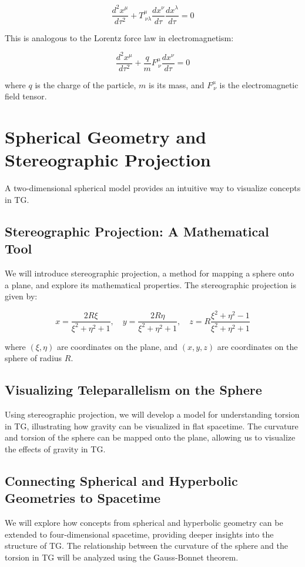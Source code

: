 \documentclass[12pt]{article}
\begin{document}
\[
\frac{d^2 x^\mu}{d\tau^2} + T^\mu_{\ \nu\lambda} \frac{dx^\nu}{d\tau} \frac{dx^\lambda}{d\tau} = 0
\]

This is analogous to the Lorentz force law in electromagnetism:

\[
\frac{d^2 x^\mu}{d\tau^2} + \frac{q}{m} F^\mu_{\ \nu} \frac{dx^\nu}{d\tau} = 0
\]

where \( q \) is the charge of the particle, \( m \) is its mass, and \( F^\mu_{\ \nu} \) is the electromagnetic field tensor.

\section{Spherical Geometry and Stereographic Projection}
A two-dimensional spherical model provides an intuitive way to visualize concepts in TG.

\subsection{Stereographic Projection: A Mathematical Tool}
We will introduce stereographic projection, a method for mapping a sphere onto a plane, and explore its mathematical properties. The stereographic projection is given by:

\[
x = \frac{2R \xi}{\xi^2 + \eta^2 + 1}, \quad y = \frac{2R \eta}{\xi^2 + \eta^2 + 1}, \quad z = R \frac{\xi^2 + \eta^2 - 1}{\xi^2 + \eta^2 + 1}
\]

where \( (\xi, \eta) \) are coordinates on the plane, and \( (x, y, z) \) are coordinates on the sphere of radius \( R \).

\subsection{Visualizing Teleparallelism on the Sphere}
Using stereographic projection, we will develop a model for understanding torsion in TG, illustrating how gravity can be visualized in flat spacetime. The curvature and torsion of the sphere can be mapped onto the plane, allowing us to visualize the effects of gravity in TG.

\subsection{Connecting Spherical and Hyperbolic Geometries to Spacetime}
We will explore how concepts from spherical and hyperbolic geometry can be extended to four-dimensional spacetime, providing deeper insights into the structure of TG. The relationship between the curvature of the sphere and the torsion in TG will be analyzed using the Gauss-Bonnet theorem.
\end{document}
